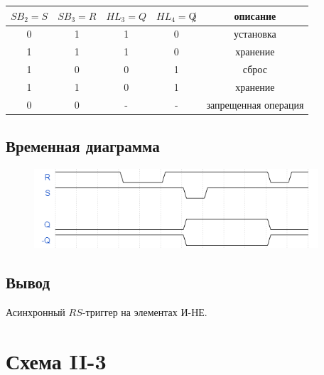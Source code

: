 \documentclass[a4paper]{article}
\begin{document}

\begin{table}[ht]
\centering
\begin{tabular}{|c|c|c|c|c|}
\hline
$SB_2 = S$ & $SB_3 = R$ & $HL_3 = Q$ & $HL_4 = \not Q$ & описание \\
\hline
0 & 1 & 1 & 0 & установка\\
1 & 1 & 1 & 0 & хранение\\
1 & 0 & 0 & 1 & сброс \\
1 & 1 & 0 & 1 & хранение \\
0 & 0 & - & - & запрещенная операция \\
\hline
\end{tabular}
\end{table}

\subsection{Временная диаграмма}
\begin{figure}[H]
    \centering
    \includegraphics[width=300pt]{d2.png}
\end{figure}


\subsection{Вывод}
Асинхронный $RS$-триггер на элементах И-НЕ.

\section{Схема II-3}
\end{document}
